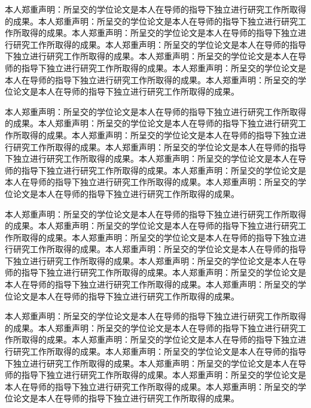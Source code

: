 \documentclass[class = professional, twoside, AutoFakeBold=3.17,AutoFakeSlant=0.2]{gdufe_master_thesis}
\begin{document}
本人郑重声明：所呈交的学位论文是本人在导师的指导下独立进行研究工作所取得的成果。本人郑重声明：所呈交的学位论文是本人在导师的指导下独立进行研究工作所取得的成果。本人郑重声明：所呈交的学位论文是本人在导师的指导下独立进行研究工作所取得的成果。本人郑重声明：所呈交的学位论文是本人在导师的指导下独立进行研究工作所取得的成果。本人郑重声明：所呈交的学位论文是本人在导师的指导下独立进行研究工作所取得的成果。本人郑重声明：所呈交的学位论文是本人在导师的指导下独立进行研究工作所取得的成果。本人郑重声明：所呈交的学位论文是本人在导师的指导下独立进行研究工作所取得的成果。
\the\baselineskip

本人郑重声明：所呈交的学位论文是本人在导师的指导下独立进行研究工作所取得的成果。本人郑重声明：所呈交的学位论文是本人在导师的指导下独立进行研究工作所取得的成果。本人郑重声明：所呈交的学位论文是本人在导师的指导下独立进行研究工作所取得的成果。本人郑重声明：所呈交的学位论文是本人在导师的指导下独立进行研究工作所取得的成果。本人郑重声明：所呈交的学位论文是本人在导师的指导下独立进行研究工作所取得的成果。本人郑重声明：所呈交的学位论文是本人在导师的指导下独立进行研究工作所取得的成果。本人郑重声明：所呈交的学位论文是本人在导师的指导下独立进行研究工作所取得的成果。
\the\baselineskip

本人郑重声明：所呈交的学位论文是本人在导师的指导下独立进行研究工作所取得的成果。本人郑重声明：所呈交的学位论文是本人在导师的指导下独立进行研究工作所取得的成果。本人郑重声明：所呈交的学位论文是本人在导师的指导下独立进行研究工作所取得的成果。本人郑重声明：所呈交的学位论文是本人在导师的指导下独立进行研究工作所取得的成果。本人郑重声明：所呈交的学位论文是本人在导师的指导下独立进行研究工作所取得的成果。本人郑重声明：所呈交的学位论文是本人在导师的指导下独立进行研究工作所取得的成果。本人郑重声明：所呈交的学位论文是本人在导师的指导下独立进行研究工作所取得的成果。
\the\baselineskip

本人郑重声明：所呈交的学位论文是本人在导师的指导下独立进行研究工作所取得的成果。本人郑重声明：所呈交的学位论文是本人在导师的指导下独立进行研究工作所取得的成果。本人郑重声明：所呈交的学位论文是本人在导师的指导下独立进行研究工作所取得的成果。本人郑重声明：所呈交的学位论文是本人在导师的指导下独立进行研究工作所取得的成果。本人郑重声明：所呈交的学位论文是本人在导师的指导下独立进行研究工作所取得的成果。本人郑重声明：所呈交的学位论文是本人在导师的指导下独立进行研究工作所取得的成果。本人郑重声明：所呈交的学位论文是本人在导师的指导下独立进行研究工作所取得的成果。
\end{document}
